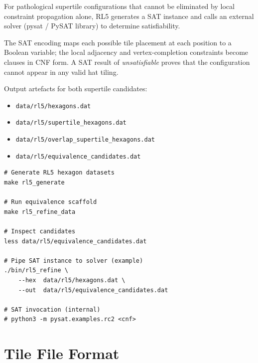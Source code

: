 \documentclass[10pt,a4paper]{article}
\newcommand{\file}[1]{\texttt{\footnotesize #1}}
\begin{document}
\begin{tcolorbox}[dualbox, title=RL5 — SAT Verification — \file{src/rl5/sat5.c}]
  For pathological supertile configurations that cannot be eliminated
  by local constraint propagation alone, RL5 generates a SAT instance
  and calls an external solver (pysat / PySAT library) to determine
  satisfiability.

  The SAT encoding maps each possible tile placement at each position
  to a Boolean variable; the local adjacency and vertex-completion
  constraints become clauses in CNF form.  A SAT result of
  \emph{unsatisfiable} proves that the configuration cannot appear in
  any valid hat tiling.

  Output artefacts for both supertile candidates:
  \begin{itemize}
    \item \file{data/rl5/hexagons.dat}
    \item \file{data/rl5/supertile\_hexagons.dat}
    \item \file{data/rl5/overlap\_supertile\_hexagons.dat}
    \item \file{data/rl5/equivalence\_candidates.dat}
  \end{itemize}
\tcblower
\begin{verbatim}
# Generate RL5 hexagon datasets
make rl5_generate

# Run equivalence scaffold
make rl5_refine_data

# Inspect candidates
less data/rl5/equivalence_candidates.dat

# Pipe SAT instance to solver (example)
./bin/rl5_refine \
    --hex  data/rl5/hexagons.dat \
    --out  data/rl5/equivalence_candidates.dat

# SAT invocation (internal)
# python3 -m pysat.examples.rc2 <cnf>
\end{verbatim}
\end{tcolorbox}

\section{Tile File Format}
\end{document}
